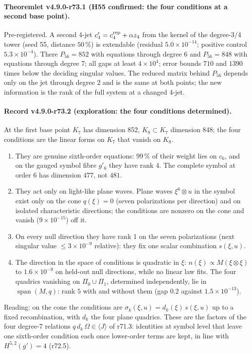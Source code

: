 \paragraph{Theoremlet v4.9.0-r73.1 (H55 confirmed: the four conditions at a second base point).}
Pre-registered.  A second 4-jet \(c_4'=c_4^{\rm rep}+\alpha z_4\) from the kernel of the degree-3/4 tower (seed 55, distance
\(50\,\%\)) is extendable (residual \(5.0\times10^{-14}\); positive control \(5.3\times10^{-4}\)).  There
\(P_{56}=852\) with equations through degree 6 and \(P_{56}=848\) with equations through degree 7; all gaps at least
\(4\times10^4\); error bounds \(710\) and \(1390\) times below the deciding singular values.  The reduced matrix behind
\(P_{56}\) depends only on the jet through degree 2 and is the same at both points; the new information is the rank of the full
system at a changed 4-jet.

\paragraph{Record v4.9.0-r73.2 (exploration: the four conditions determined).}
At the first base point \(K_7\) has dimension 852, \(K_8\subset K_7\) dimension 848; the four conditions are the linear forms on
\(K_7\) that vanish on \(K_8\).
\begin{enumerate}[leftmargin=2em]
\item[(a)] They are genuine sixth-order equations: \(99\,\%\) of their weight lies on \(c_6\), and on the gauged symbol fibre
\(g'_6\) they have rank 4.  The complete symbol at order 6 has dimension \(477\), not \(481\).
\item[(b)] They act only on light-like plane waves.  Plane waves \(\xi^6\otimes u\) in the symbol exist only on the cone
\(q(\xi)=0\) (seven polarizations per direction) and on isolated characteristic directions; the conditions are nonzero on the
cone and vanish (\(9\times10^{-15}\)) off it.
\item[(c)] On every null direction they have rank 1 on the seven polarizations (next singular value \(\le3\times10^{-9}\)
relative): they fix one scalar combination \(s(\xi,u)\).
\item[(d)] The direction in the space of conditions is quadratic in \(\xi\): \(n(\xi)\propto M(\xi\otimes\xi)\) to
\(1.6\times10^{-9}\) on held-out null directions, while no linear law fits.  The four quadrics vanishing on
\(\Pi_0\cup\Pi_1\), determined independently, lie in \(\operatorname{span}(M,q)\): rank \(5\) with and without them (gap
\(0.2\) against \(1.5\times10^{-13}\)).
\end{enumerate}
Reading: on the cone the conditions are \(\sigma_k(\xi,u)=d_k(\xi)\,s(\xi,u)\) up to a fixed recombination, with \(d_k\) the
four plane quadrics.  These are the factors of the four degree-7 relations \(q\,d_k\,\Omega\in\langle J\rangle\) of r71.3:
identities at symbol level that leave one sixth-order condition each once lower-order terms are kept, in line with
\(H^{5,2}(g')=4\) (r72.5).


